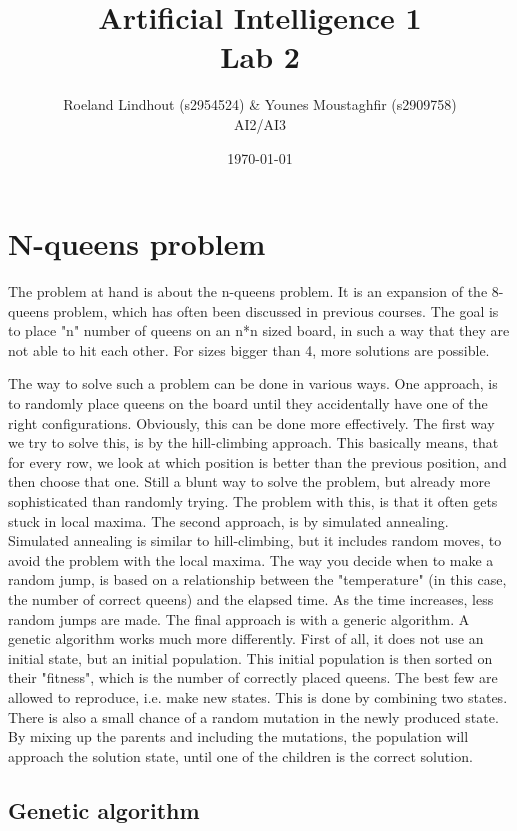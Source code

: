 \documentclass{article}
\title{Artificial Intelligence 1 \\ Lab 2}%
\author{Roeland Lindhout (s2954524) \& Younes Moustaghfir (s2909758) \\ AI2/AI3} %
\date{\today}%
\begin{document}
	
	\maketitle
	
	\section*{N-queens problem}
	
	The problem at hand is about the n-queens problem. It is an expansion of the 8-queens problem, which has often been discussed in previous courses. The goal is to place "n" number of queens on an n*n sized board, in such a way that they are not able to hit each other. For sizes bigger than 4, more solutions are possible.
	
	The way to solve such a problem can be done in various ways. One approach, is to randomly place queens on the board until they accidentally have one of the right configurations. Obviously, this can be done more effectively. The first way we try to solve this, is by the hill-climbing approach. This basically means, that for every row, we look at which position is better than the previous position, and then choose that one. Still a blunt way to solve the problem, but already more sophisticated than randomly trying. The problem with this, is that it often gets stuck in local maxima. The second approach, is by simulated annealing. Simulated annealing is similar to hill-climbing, but it includes random moves, to avoid the problem with the local maxima. The way you decide when to make a random jump, is based on a relationship between the "temperature" (in this case, the number of correct queens) and the elapsed time. As the time increases, less random jumps are made. The final approach is with a generic algorithm. A genetic algorithm works much more differently. First of all, it does not use an initial state, but an initial population. This initial population is then sorted on their "fitness", which is the number of correctly placed queens. The best few are allowed to reproduce, i.e. make new states. This is done by combining two states. There is also a small chance of a random mutation in the newly produced state. By mixing up the parents and including the mutations, the population will approach the solution state, until one of the children is the correct solution.
	\subsection*{Genetic algorithm}
	
\end{document}
